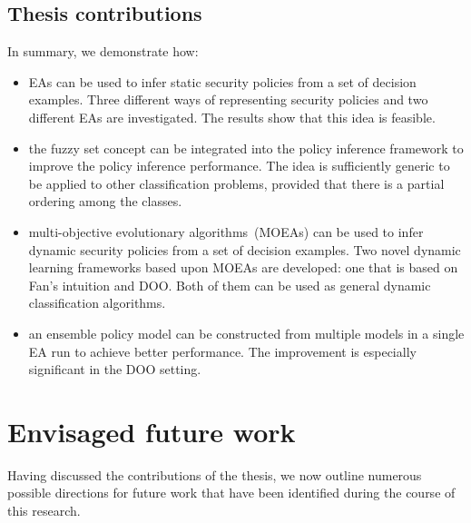 \subsection{Thesis contributions}
In summary, we demonstrate how:
\begin{itemize}
\item EAs can be used to infer static security policies from a set of
  decision examples. Three different ways of representing security
  policies and two different EAs are investigated. The results show
  that this idea is feasible.
\item the fuzzy set concept can be integrated into the policy
  inference framework to improve the policy inference performance. The
  idea is sufficiently generic to be applied to other classification
  problems, provided that there is a partial ordering among the
  classes.
\item multi-objective evolutionary algorithms~(MOEAs) can be used to
  infer dynamic security policies from a set of decision examples. Two
  novel dynamic learning frameworks based upon MOEAs are developed:
  one that is based on Fan's intuition and DOO. Both of them can be
  used as general dynamic classification algorithms.
\item an ensemble policy model can be constructed from multiple models
  in a single EA run to achieve better performance. The improvement is
  especially significant in the DOO setting.
\end{itemize}

\section{Envisaged future work}
Having discussed the contributions of the thesis, we now outline
numerous possible directions for future work that have been identified
during the course of this research.

